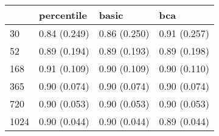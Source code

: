 \begin{tabular}{llll}
\toprule
 & percentile & basic & bca \\
\midrule
30 & 0.84 (0.249) & 0.86 (0.250) & 0.91 (0.257) \\
52 & 0.89 (0.194) & 0.89 (0.193) & 0.89 (0.198) \\
168 & 0.91 (0.109) & 0.90 (0.109) & 0.90 (0.110) \\
365 & 0.90 (0.074) & 0.90 (0.074) & 0.90 (0.074) \\
720 & 0.90 (0.053) & 0.90 (0.053) & 0.90 (0.053) \\
1024 & 0.90 (0.044) & 0.90 (0.044) & 0.89 (0.044) \\
\bottomrule
\end{tabular}
